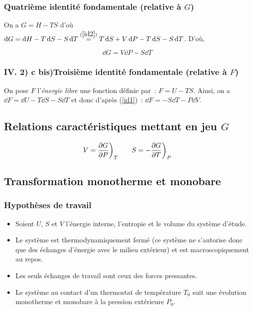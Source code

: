 \documentclass{article}
\let\oldref\ref
\renewcommand{\ref}[1]{(\oldref{#1})}
\begin{document}
\subsubsection{Quatrième identité fondamentale  (relative à $G$)}
\begin{tableau}
    On a $G = H-TS $ d'où $\dd{G} = \dd{H} - T\dd{S} - S\dd{T} \overset{\ref{id2}}{=} T\dd{S} + V\dd{P} - T\dd{S} - S\dd{T}$. D'où,
    \begin{important}
        \begin{equation}\label{id4}
            \dd{G} = V\dd{P} - S\dd{T}
        \end{equation}
    \end{important}
\end{tableau}
\subsubsection*{IV. 2) c bis)\quad Troisième identité fondamentale  (relative à $F$)}
\begin{tableau}
    On pose $F$ l'\textit{énergie libre} une fonction définie par~: $F=U-TS$. Ainsi, on a $\dd{F} = \dd{U} - T\dd{S} - S\dd{T}$ et donc d'après \ref{id1}~: $\dd{F} = -S\dd{T} - P\dd{V}$.
\end{tableau}

\subsection{Relations caractéristiques mettant en jeu $G$}
\begin{tableau}
    $$V= \pdv{G}{P}\bigg)_T \qquad S = - \pdv{G}{T}\bigg)_P$$
\end{tableau}

\subsection{Transformation monotherme et monobare}
\subsubsection{Hypothèses de travail}
\begin{itemize}
    \item Soient $U$, $S$ et $V$ l'énergie interne, l'entropie et le volume du système d'étude.
    \item Le système est thermodynamiquement fermé (ce système ne s'autorise donc que des échanges d'énergie avec le milieu extérieur) et est macroscopiquement au repos.
    \item Les seuls échanges de travail sont ceux des forces pressantes.
    \item Le système au contact d'un thermostat de température $T_0$ suit une évolution monotherme et monobare à la pression extérieure $P_0$.
\end{itemize}
\end{document}
